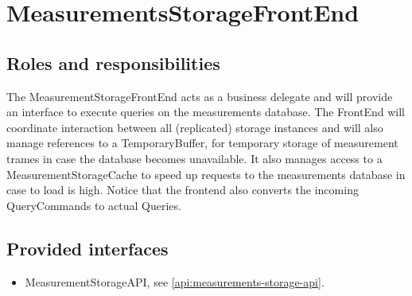 \section{MeasurementsStorageFrontEnd}
\label{element:measurements-storage-front-end}

\subsection{Roles and responsibilities}

\npar The MeasurementStorageFrontEnd acts as a business delegate and will
provide an interface to execute queries on the measurements database. The
FrontEnd will coordinate interaction between all (replicated) storage instances
and will also manage references to a TemporaryBuffer, for temporary storage of
measurement trames in case the database becomes unavailable. It also manages
access to a MeasurementStorageCache to speed up requests to the measurements
database in case to load is high. Notice that the frontend also converts the
incoming QueryCommands to actual Queries.

\subsection{Provided interfaces}

\begin{itemize}
  \item MeasurementStorageAPI, see \ref{api:measurements-storage-api}.
\end{itemize}